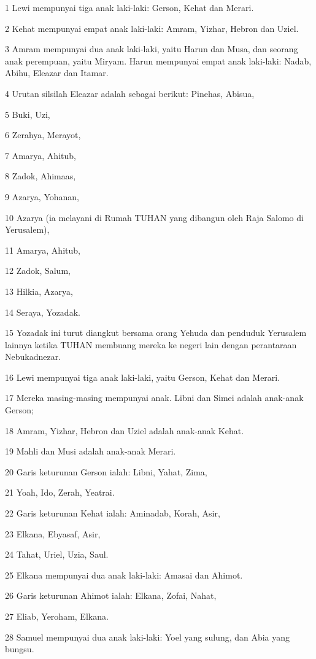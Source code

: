 \par 1 Lewi mempunyai tiga anak laki-laki: Gerson, Kehat dan Merari.
\par 2 Kehat mempunyai empat anak laki-laki: Amram, Yizhar, Hebron dan Uziel.
\par 3 Amram mempunyai dua anak laki-laki, yaitu Harun dan Musa, dan seorang anak perempuan, yaitu Miryam. Harun mempunyai empat anak laki-laki: Nadab, Abihu, Eleazar dan Itamar.
\par 4 Urutan silsilah Eleazar adalah sebagai berikut: Pinehas, Abisua,
\par 5 Buki, Uzi,
\par 6 Zerahya, Merayot,
\par 7 Amarya, Ahitub,
\par 8 Zadok, Ahimaas,
\par 9 Azarya, Yohanan,
\par 10 Azarya (ia melayani di Rumah TUHAN yang dibangun oleh Raja Salomo di Yerusalem),
\par 11 Amarya, Ahitub,
\par 12 Zadok, Salum,
\par 13 Hilkia, Azarya,
\par 14 Seraya, Yozadak.
\par 15 Yozadak ini turut diangkut bersama orang Yehuda dan penduduk Yerusalem lainnya ketika TUHAN membuang mereka ke negeri lain dengan perantaraan Nebukadnezar.
\par 16 Lewi mempunyai tiga anak laki-laki, yaitu Gerson, Kehat dan Merari.
\par 17 Mereka masing-masing mempunyai anak. Libni dan Simei adalah anak-anak Gerson;
\par 18 Amram, Yizhar, Hebron dan Uziel adalah anak-anak Kehat.
\par 19 Mahli dan Musi adalah anak-anak Merari.
\par 20 Garis keturunan Gerson ialah: Libni, Yahat, Zima,
\par 21 Yoah, Ido, Zerah, Yeatrai.
\par 22 Garis keturunan Kehat ialah: Aminadab, Korah, Asir,
\par 23 Elkana, Ebyasaf, Asir,
\par 24 Tahat, Uriel, Uzia, Saul.
\par 25 Elkana mempunyai dua anak laki-laki: Amasai dan Ahimot.
\par 26 Garis keturunan Ahimot ialah: Elkana, Zofai, Nahat,
\par 27 Eliab, Yeroham, Elkana.
\par 28 Samuel mempunyai dua anak laki-laki: Yoel yang sulung, dan Abia yang bungsu.
